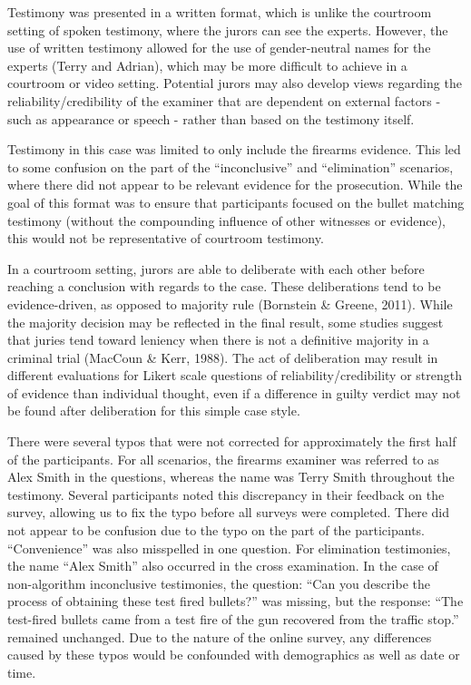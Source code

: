 \documentclass[print]{nuthesis}
\begin{document}
Testimony was presented in a written format, which is unlike the courtroom setting of spoken testimony, where the jurors can see the experts.
However, the use of written testimony allowed for the use of gender-neutral names for the experts (Terry and Adrian), which may be more difficult to achieve in a courtroom or video setting.
Potential jurors may also develop views regarding the reliability/credibility of the examiner that are dependent on external factors - such as appearance or speech - rather than based on the testimony itself.

Testimony in this case was limited to only include the firearms evidence.
This led to some confusion on the part of the ``inconclusive'' and ``elimination'' scenarios, where there did not appear to be relevant evidence for the prosecution.
While the goal of this format was to ensure that participants focused on the bullet matching testimony (without the compounding influence of other witnesses or evidence), this would not be representative of courtroom testimony.

In a courtroom setting, jurors are able to deliberate with each other before reaching a conclusion with regards to the case.
These deliberations tend to be evidence-driven, as opposed to majority rule (Bornstein \& Greene, 2011).
While the majority decision may be reflected in the final result, some studies suggest that juries tend toward leniency when there is not a definitive majority in a criminal trial (MacCoun \& Kerr, 1988).
The act of deliberation may result in different evaluations for Likert scale questions of reliability/credibility or strength of evidence than individual thought, even if a difference in guilty verdict may not be found after deliberation for this simple case style.

There were several typos that were not corrected for approximately the first half of the participants.
For all scenarios, the firearms examiner was referred to as Alex Smith in the questions, whereas the name was Terry Smith throughout the testimony.
Several participants noted this discrepancy in their feedback on the survey, allowing us to fix the typo before all surveys were completed.
There did not appear to be confusion due to the typo on the part of the participants.
``Convenience'' was also misspelled in one question.
For elimination testimonies, the name ``Alex Smith'' also occurred in the cross examination.
In the case of non-algorithm inconclusive testimonies, the question: ``Can you describe the process of obtaining these test fired bullets?'' was missing, but the response: ``The test-fired bullets came from a test fire of the gun recovered from the traffic stop.'' remained unchanged.
Due to the nature of the online survey, any differences caused by these typos would be confounded with demographics as well as date or time.
\end{document}

